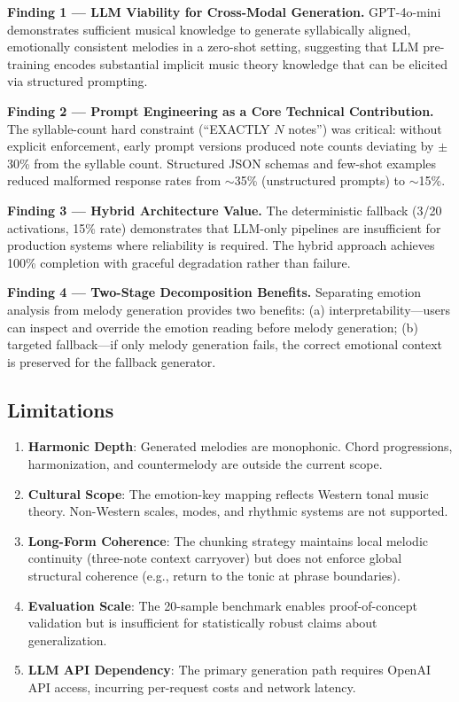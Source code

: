 \documentclass[conference]{IEEEtran}
\begin{document}
\textbf{Finding 1 --- LLM Viability for Cross-Modal Generation.}
GPT-4o-mini demonstrates sufficient musical knowledge to generate syllabically
aligned, emotionally consistent melodies in a zero-shot setting, suggesting
that LLM pre-training encodes substantial implicit music theory knowledge that
can be elicited via structured prompting.

\textbf{Finding 2 --- Prompt Engineering as a Core Technical Contribution.}
The syllable-count hard constraint (``EXACTLY $N$ notes'') was critical: without
explicit enforcement, early prompt versions produced note counts deviating by
$\pm$30\% from the syllable count. Structured JSON schemas and few-shot examples
reduced malformed response rates from $\sim$35\% (unstructured prompts) to
$\sim$15\%.

\textbf{Finding 3 --- Hybrid Architecture Value.}
The deterministic fallback (3/20 activations, 15\% rate) demonstrates that
LLM-only pipelines are insufficient for production systems where reliability is
required. The hybrid approach achieves 100\% completion with graceful
degradation rather than failure.

\textbf{Finding 4 --- Two-Stage Decomposition Benefits.}
Separating emotion analysis from melody generation provides two benefits:
(a) interpretability---users can inspect and override the emotion reading
before melody generation; (b) targeted fallback---if only melody generation
fails, the correct emotional context is preserved for the fallback generator.

\subsection{Limitations}

\begin{enumerate}
  \item \textbf{Harmonic Depth}: Generated melodies are monophonic. Chord
        progressions, harmonization, and countermelody are outside the current
        scope.
  \item \textbf{Cultural Scope}: The emotion-key mapping reflects Western tonal
        music theory. Non-Western scales, modes, and rhythmic systems are not
        supported.
  \item \textbf{Long-Form Coherence}: The chunking strategy maintains local
        melodic continuity (three-note context carryover) but does not enforce
        global structural coherence (e.g., return to the tonic at phrase
        boundaries).
  \item \textbf{Evaluation Scale}: The 20-sample benchmark enables
        proof-of-concept validation but is insufficient for statistically robust
        claims about generalization.
  \item \textbf{LLM API Dependency}: The primary generation path requires
        OpenAI API access, incurring per-request costs and network latency.
\end{enumerate}
\end{document}

